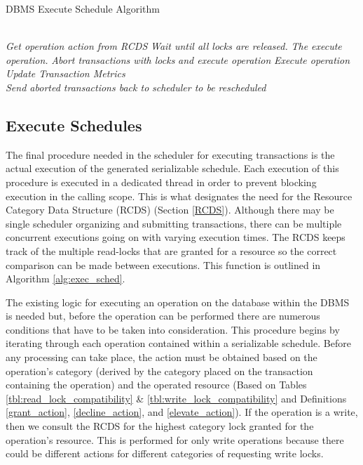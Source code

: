 \documentclass[conference]{IEEEtran}
\begin{document}
\begin{algorithm}
\caption{DBMS Execute Schedule Algorithm}
\label{alg:exec_sched}
\begin{algorithmic}[1]

    \\
        \State \textit{Get operation action from RCDS}
            \State \textit{Wait until all locks are released.}
            \State \textit{The execute operation.}
            \State \textit{Abort transactions with locks}
            \State \textit{and execute operation}
            \State \textit{Execute operation}
        \EndIf
    \EndFor
    \\
    \State \textit{Update Transaction Metrics}
    \\
    \State \textit{Send aborted transactions back to}
    \State \textit{scheduler to be rescheduled}
\EndProcedure

\end{algorithmic}
\end{algorithm}

\subsection{Execute Schedules}
The final procedure needed in the scheduler for executing transactions is the actual execution of the generated serializable schedule. Each execution of this procedure is executed in a dedicated thread in order to prevent blocking execution in the calling scope. This is what designates the need for the Resource Category Data Structure (RCDS) (Section \ref{RCDS}). Although there may be single scheduler organizing and submitting transactions, there can be multiple concurrent executions going on with varying execution times. The RCDS keeps track of the multiple read-locks that are granted for a resource so the correct comparison can be made between executions. This function is outlined in Algorithm \ref{alg:exec_sched}.

The existing logic for executing an operation on the database within the DBMS is needed but, before the operation can be performed there are numerous conditions that have to be taken into consideration. This procedure begins by iterating through each operation contained within a serializable schedule. Before any processing can take place, the action must be obtained based on the operation's category (derived by the category placed on the transaction containing the operation) and the operated resource (Based on Tables \ref{tbl:read_lock_compatibility} \& \ref{tbl:write_lock_compatibility} and Definitions \ref{grant_action}, \ref{decline_action}, and \ref{elevate_action}). If the operation is a write, then we consult the RCDS for the highest category lock granted for the operation's resource. This is performed for only write operations because there could be different actions for different categories of requesting write locks.
\end{document}
